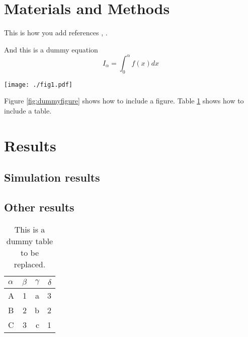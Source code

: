 \documentclass[11pt,twocolumn,twoside]{article}
\begin{document}
\lipsum[2-5]


\section{Materials and Methods}

This is how you add references \cite{Deen2019}, \cite{Doe2020}.

And this is a dummy equation
\begin{equation}
I_\alpha = \int_0^\alpha f(x) dx
\end{equation}

\begin{figure*}
  \centering
  \texttt{[image: ./fig1.pdf]}
  \caption{This a dummy figure to be replaced.}
  \label{fig:dummyfigure}
\end{figure*}

Figure \ref{fig:dummyfigure} shows how to include a figure.
Table \ref{tab:dummytable} shows how to include a table.

\bigskip

\lipsum[2-7]

\section{Results}
\subsection{Simulation results}

\lipsum[2-3]

\subsection{Other results}
\lipsum[2-3]

\begin{table}
  \centering
  \begin{tabular}{lrrr}
  \toprule
  $\alpha$   & $\beta$ & $\gamma$ & $\delta$ \\
  \midrule
  A          & 1       & a        & 3        \\
  B          & 2       & b        & 2        \\
  C          & 3       & c        & 1        \\
  \bottomrule
  \end{tabular}
  \caption{This is a dummy table to be replaced.}
  \label{tab:dummytable}
\end{table}
\end{document}
